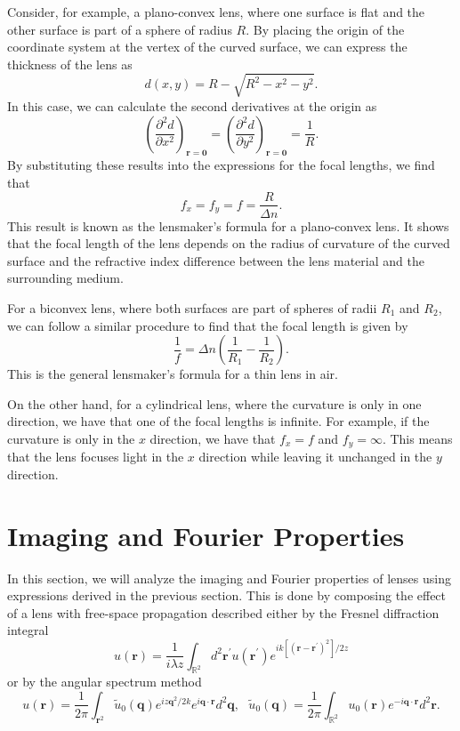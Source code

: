 \documentclass[a4paper,10pt]{article}
\begin{document}
Consider, for example, a plano-convex lens, where one surface is flat and the other surface is part of a sphere of radius $R$. By placing the origin of the coordinate system at the vertex of the curved surface, we can express the thickness of the lens as
\begin{equation}
    d(x,y) = R - \sqrt{R^2 - x^2 - y^2}.
\end{equation}
In this case, we can calculate the second derivatives at the origin as
\begin{equation}
    \left( \frac{\partial^2 d}{\partial x^2} \right)_{\mathbf{r} = \boldsymbol{0}} = \left( \frac{\partial^2 d}{\partial y^2} \right)_{\mathbf{r} = \boldsymbol{0}} = \frac{1}{R}.
\end{equation}
By substituting these results into the expressions for the focal lengths, we find that
\begin{equation}
    f_x = f_y = f = \frac{R}{\Delta n}.
\end{equation}
This result is known as the lensmaker's formula for a plano-convex lens. It shows that the focal length of the lens depends on the radius of curvature of the curved surface and the refractive index difference between the lens material and the surrounding medium.

For a biconvex lens, where both surfaces are part of spheres of radii $R_1$ and $R_2$, we can follow a similar procedure to find that the focal length is given by
\begin{equation}
    \frac{1}{f} = \Delta n \left( \frac{1}{R_1} - \frac{1}{R_2} \right).
\end{equation}
This is the general lensmaker's formula for a thin lens in air.

On the other hand, for a cylindrical lens, where the curvature is only in one direction, we have that one of the focal lengths is infinite. For example, if the curvature is only in the $x$ direction, we have that $f_x = f$ and $f_y = \infty$. This means that the lens focuses light in the $x$ direction while leaving it unchanged in the $y$ direction.

\section{Imaging and Fourier Properties}

In this section, we will analyze the imaging and Fourier properties of lenses using expressions derived in the previous section. This is done by composing the effect of a lens with free-space propagation described either by the Fresnel diffraction integral
\begin{equation}
     u(\mathbf{r}) = \frac{1}{i\lambda z} \int_{\mathbb{R}^2} d^2\mathbf{r}^\prime u(\mathbf{r}^\prime) e^{ik[(\mathbf{r} - \mathbf{r}^\prime)^2] / 2z}
\end{equation}
or by the angular spectrum method
\begin{equation}
    u(\mathbf{r}) = \frac{1}{2\pi}\int_{\mathbf{r}^2} \tilde{u}_0(\mathbf{q}) e^{i z \mathbf{q}^2 / 2k} e^{i \mathbf{q} \cdot \mathbf{r}} d^2 \mathbf{q}, \ \ \ \tilde{u}_0(\mathbf{q}) = \frac{1}{2\pi} \int_{\mathbb{R}^2} u_0(\mathbf{r}) e^{-i \mathbf{q} \cdot \mathbf{r}} d^2 \mathbf{r}.
\end{equation}
\end{document}
